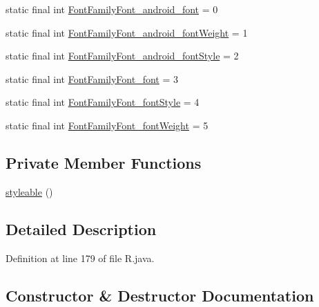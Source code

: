 \begin{DoxyCompactItemize}
static final int \mbox{\hyperlink{classandroid_1_1support_1_1v4_1_1_r_1_1styleable_ac0d9ff00875f5b89a2438aa2005bdd80}{Font\+Family\+Font\+\_\+android\+\_\+font}} = 0
\item 
static final int \mbox{\hyperlink{classandroid_1_1support_1_1v4_1_1_r_1_1styleable_a8ee1efc7fab642326b7783a360e3a2c5}{Font\+Family\+Font\+\_\+android\+\_\+font\+Weight}} = 1
\item 
static final int \mbox{\hyperlink{classandroid_1_1support_1_1v4_1_1_r_1_1styleable_ab41887d8bbf0b2bca5b649e83aed697b}{Font\+Family\+Font\+\_\+android\+\_\+font\+Style}} = 2
\item 
static final int \mbox{\hyperlink{classandroid_1_1support_1_1v4_1_1_r_1_1styleable_a34399eff955f22f34653274751e96569}{Font\+Family\+Font\+\_\+font}} = 3
\item 
static final int \mbox{\hyperlink{classandroid_1_1support_1_1v4_1_1_r_1_1styleable_a629caf7a9a9f179867eeafb5b9b37cbc}{Font\+Family\+Font\+\_\+font\+Style}} = 4
\item 
static final int \mbox{\hyperlink{classandroid_1_1support_1_1v4_1_1_r_1_1styleable_a9d48063e49f6fb0af52e9087c4b62b42}{Font\+Family\+Font\+\_\+font\+Weight}} = 5
\end{DoxyCompactItemize}
\subsection*{Private Member Functions}
\begin{DoxyCompactItemize}
\item 
\mbox{\hyperlink{classandroid_1_1support_1_1v4_1_1_r_1_1styleable_aa38fbfc85a98cbc6283fad7b994a9e1c}{styleable}} ()
\end{DoxyCompactItemize}


\subsection{Detailed Description}


Definition at line 179 of file R.\+java.



\subsection{Constructor \& Destructor Documentation}
\mbox{\label{classandroid_1_1support_1_1v4_1_1_r_1_1styleable_aa38fbfc85a98cbc6283fad7b994a9e1c}} 
